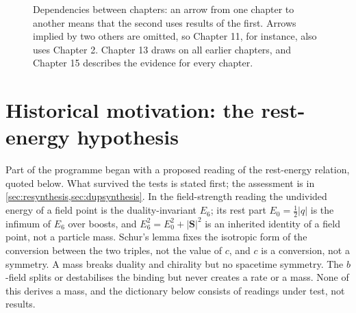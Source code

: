 \begin{figure}[t]
\centering
{}
\caption{Dependencies between chapters: an arrow from one chapter to another means that the second uses results of the first. Arrows implied by
two others are omitted, so Chapter 11, for instance, also uses Chapter 2. Chapter 13 draws on all earlier chapters, and Chapter 15 describes the
evidence for every chapter.}
\label{fig:depmap}
\end{figure}



\section{Historical motivation: the rest-energy hypothesis}
\label{s0:sec:question}

Part of the programme began with a proposed reading of the rest-energy relation, quoted below. What survived the tests is stated first; the
assessment is in \cref{sec:resynthesis,sec:dupsynthesis}. In the field-strength reading the undivided energy of a field point is the
duality-invariant $E_6$; its rest part $E_0=\tfrac12|q|$ is the infimum of $E_6$ over boosts, and $E_6^2=E_0^2+|\mathbf S|^2$ is an inherited
identity of a field point, not a particle mass. Schur's lemma fixes the isotropic form of the conversion between the two triples, not the
value of $c$, and $c$ is a conversion, not a symmetry. A mass breaks duality and chirality but no spacetime symmetry. The $b$-field splits or
destabilises the binding but never creates a rate or a mass. None of this derives a mass, and the dictionary below consists of readings under
test, not results.

